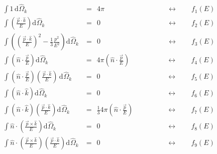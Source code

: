 \begin{eqnarray}
\int 1 \,                                                 \textrm{d}^{}_{}\hat{\Omega}_k &= \:\: 4\pi 
\;\;\;\;\;\;\; \;\;\;\;\;\;\; \;\;\;\;\;\;\; \;\;\;\;\;\;\; \;&\leftrightarrow \;\;\;\;\;\;\; f_1(E)
\\
\int \left(\! \frac{\vec{p}\cdot \hat{k}}{E} \!\right)    \textrm{d}^{}_{}\hat{\Omega}_k &= \:\:  0   
\;\;  \;\;\;\;\;\;\; \;\;\;\;\;\;\; \;\;\;\;\;\;\; \;\;\;\;\;\;\; \;&\leftrightarrow \;\;\;\;\;\;\; f_2(E)
\\
\int \left(\! \left(\! \frac{\vec{p}\cdot \hat{k}}{E}\!\right)^2 - \frac{1}{3} \frac{p^2}{E^2} \!\right)    \textrm{d}^{}_{}\hat{\Omega}_k &=  \:\: 0   
\;\;  \;\;\;\;\;\;\; \;\;\;\;\;\;\; \;\;\;\;\;\;\; \;\;\;\;\;\;\; \;&\leftrightarrow \;\;\;\;\;\;\; f_3(E)
\end{eqnarray}
\begin{eqnarray}
\int \left( \hat{n}\cdot \frac{\vec{p}}{E} \right)  \textrm{d}^{}_{}\hat{\Omega}_k &= \:\:  4\pi \left( \hat{n}\cdot \frac{\vec{p}}{E} \right)
\,  \;\;\;\;\;\;\; \;\;\;\;\;\;\; \;&\leftrightarrow \;\;\;\;\;\;\;  f_4(E)
\\
\int \left(\hat{n}\cdot\frac{\vec{p}}{E}\right)\left(\frac{\vec{p}\cdot \hat{k}}{E}\right)  \,\textrm{d}^{}_{}\hat{\Omega}_k &=  \:\: 0
\;\;  \;\;\;\;\;\;\; \;\;\;\;\;\;\; \;\;\;\;\;\;\; \;\;\;\;\;\;\; \;&\leftrightarrow \;\;\;\;\;\;\; f_5(E)
\\
\int \left( \hat{n}\cdot\hat{k} \right)   \textrm{d}^{}_{}\hat{\Omega}_k &= \:\: 0
\;\;  \;\;\;\;\;\;\; \;\;\;\;\;\;\; \;\;\;\;\;\;\; \;\;\;\;\;\;\; \;&\leftrightarrow \;\;\;\;\;\;\; f_6(E)
\\
\int \left( \hat{n}\cdot\hat{k} \right)\left( \frac{\vec{p}\cdot\hat{k}}{E}\right)   \textrm{d}^{}_{}\hat{\Omega}_k &= \:\:  \frac{1}{3} 4\pi \left(\hat{n}\cdot \frac{\vec{p}}{E}\right)
\, \;\;\;\; \;\;\;\;\;\;\; \;&\leftrightarrow \;\;\;\;\;\;\; f_7(E)
\\
\int \hat{n}\cdot \left( \frac{\vec{p}\times \hat{k}}{E} \right) \textrm{d}^{}_{}\hat{\Omega}_k &= \:\:  0
\;\;  \;\;\;\;\;\;\; \;\;\;\;\;\;\; \;\;\;\;\;\;\; \;\;\;\;\;\;\; \;&\leftrightarrow \;\;\;\;\;\;\; f_8(E)
\\
\int \hat{n}\cdot \left( \frac{\vec{p}\times \hat{k}}{E} \right) \left(\frac{\vec{p}\cdot \hat{k}}{E}\right)  \textrm{d}^{}_{}\hat{\Omega}_k &= \:\: 0
\;\;  \;\;\;\;\;\;\; \;\;\;\;\;\;\; \;\;\;\;\;\;\; \;\;\;\;\;\;\; \; &\leftrightarrow \;\;\;\;\;\;\; f_9(E)
\end{eqnarray}
